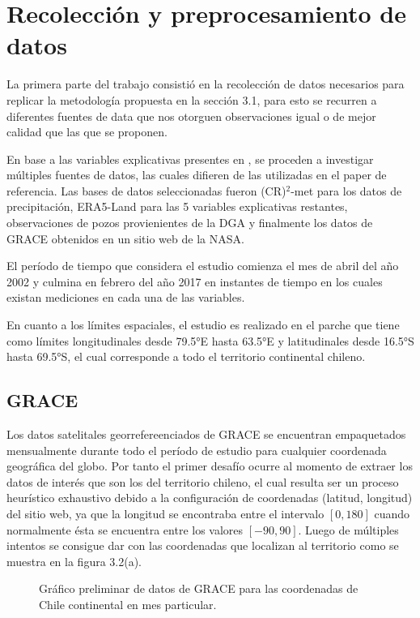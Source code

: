 %
%
%
%
\section{Recolección y preprocesamiento de datos}


La primera parte del trabajo consistió en la recolección de datos necesarios para replicar la metodología
propuesta en la sección 3.1, para esto se recurren a diferentes fuentes de data que nos otorguen observaciones igual
o de mejor calidad que las que se proponen.

En base a las variables explicativas presentes en \cite{11}, se proceden a investigar múltiples fuentes de datos, las cuales difieren de las utilizadas en el paper de referencia. 
Las bases de datos seleccionadas fueron (CR)$^2$-met para los datos de precipitación, ERA5-Land para las 5 variables explicativas restantes,
observaciones de pozos provienientes de la DGA y finalmente los datos de GRACE obtenidos en un sitio web de la NASA.

El período de tiempo que considera el estudio comienza el mes de abril del año 2002 y culmina en febrero del año 2017 en instantes de tiempo en los cuales existan mediciones en cada una
de las variables.

En cuanto a los límites espaciales, el estudio es realizado en el parche que tiene como límites longitudinales desde 79.5°E hasta 63.5°E y latitudinales desde 16.5°S hasta
69.5°S, el cual corresponde a todo el territorio continental chileno.

    \subsection{GRACE}
    Los datos satelitales georrefereenciados de GRACE se encuentran empaquetados mensualmente durante todo el período de estudio
    para cualquier coordenada geográfica del globo. Por tanto el primer desafío ocurre al momento de extraer los datos de interés que son los  
    del territorio chileno, el cual resulta ser un proceso heurístico exhaustivo debido a la configuración de coordenadas (latitud, longitud) del sitio web,
    ya que la longitud se encontraba entre el intervalo $[0,180]$ cuando normalmente ésta se encuentra entre los valores $[-90,90]$. Luego de múltiples intentos
    se consigue dar con las coordenadas que localizan al territorio como se muestra en la figura 3.2(a).
    
    \begin{figure}[H]
        \centering
              \goodgap
              \vskip -0.1in
        \caption[Rutina para extracción de datos GRACE]{Gráfico preliminar de datos de GRACE para las coordenadas de Chile continental en mes particular.}
        \label{logo}
    \end{figure}

